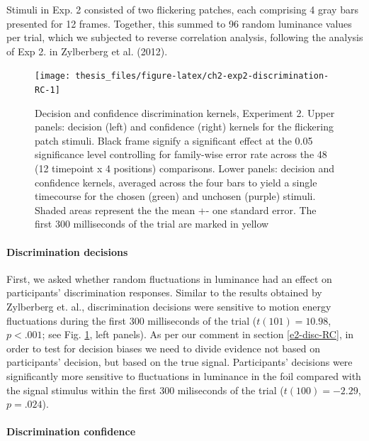 \documentclass[12pt,twoside]{reedthesis}
\begin{document}
Stimuli in Exp. 2 consisted of two flickering patches, each comprising 4 gray bars presented for 12 frames. Together, this summed to 96 random luminance values per trial, which we subjected to reverse correlation analysis, following the analysis of Exp 2. in Zylberberg et al. (2012).
\begin{figure}
\texttt{[image: thesis\_files/figure-latex/ch2-exp2-discrimination-RC-1]} \caption[Decision kernels in discrimination, Exp. 2]{Decision and confidence discrimination kernels, Experiment 2. Upper panels: decision (left) and confidence (right) kernels for the flickering patch stimuli. Black frame signify a significant effect at the 0.05 significance level controlling for family-wise error rate across the 48 (12 timepoint x 4 positions) comparisons. Lower panels: decision and confidence kernels, averaged across the four bars to yield a single timecourse for the chosen (green) and unchosen (purple) stimuli. Shaded areas represent the the mean +- one standard error. The first 300 milliseconds of the trial are marked in yellow}\label{fig:ch2-exp2-discrimination-RC}
\end{figure}
\hypertarget{discrimination-decisions}{%
\paragraph{Discrimination decisions}\label{discrimination-decisions}}

First, we asked whether random fluctuations in luminance had an effect on participants' discrimination responses. Similar to the results obtained by Zylberberg et. al., discrimination decisions were sensitive to motion energy fluctuations during the first 300 milliseconds of the trial (\(t(101) = 10.98\), \(p < .001\); see Fig. \ref{fig:ch2-exp2-discrimination-RC}, left panels). As per our comment in section \ref{e2-disc-RC}, in order to test for decision biases we need to divide evidence not based on participants' decision, but based on the true signal. Participants' decisions were significantly more sensitive to fluctuations in luminance in the foil compared with the signal stimulus within the first 300 miliseconds of the trial (\(t(100) = -2.29\), \(p = .024\)).

\hypertarget{discrimination-confidence}{%
\paragraph{Discrimination confidence}\label{discrimination-confidence}}
\end{document}
